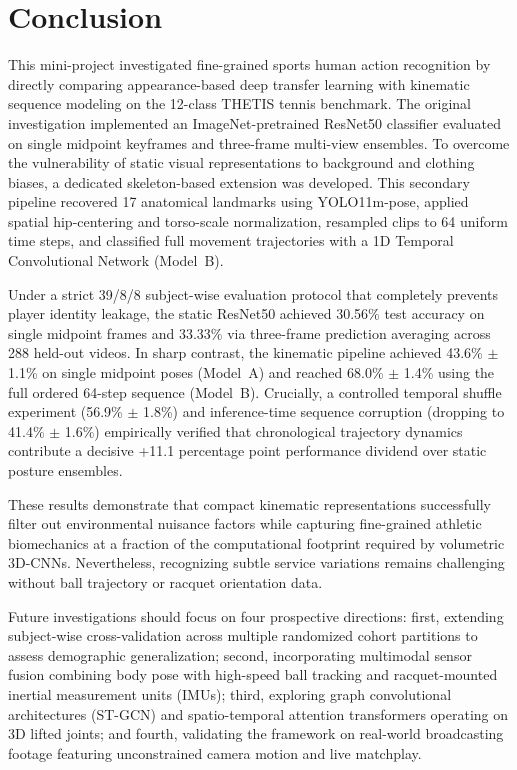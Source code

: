 \documentclass[12pt,a4paper]{article}
\begin{document}
\clearpage
\section{Conclusion}
This mini-project investigated fine-grained sports human action recognition by directly comparing appearance-based deep transfer learning with kinematic sequence modeling on the 12-class THETIS tennis benchmark. The original investigation implemented an ImageNet-pretrained ResNet50 classifier evaluated on single midpoint keyframes and three-frame multi-view ensembles. To overcome the vulnerability of static visual representations to background and clothing biases, a dedicated skeleton-based extension was developed. This secondary pipeline recovered 17 anatomical landmarks using YOLO11m-pose, applied spatial hip-centering and torso-scale normalization, resampled clips to 64 uniform time steps, and classified full movement trajectories with a 1D Temporal Convolutional Network (Model~B).

Under a strict 39/8/8 subject-wise evaluation protocol that completely prevents player identity leakage, the static ResNet50 achieved 30.56\% test accuracy on single midpoint frames and 33.33\% via three-frame prediction averaging across 288 held-out videos. In sharp contrast, the kinematic pipeline achieved 43.6\% $\pm$ 1.1\% on single midpoint poses (Model~A) and reached 68.0\% $\pm$ 1.4\% using the full ordered 64-step sequence (Model~B). Crucially, a controlled temporal shuffle experiment (56.9\% $\pm$ 1.8\%) and inference-time sequence corruption (dropping to 41.4\% $\pm$ 1.6\%) empirically verified that chronological trajectory dynamics contribute a decisive +11.1 percentage point performance dividend over static posture ensembles.

These results demonstrate that compact kinematic representations successfully filter out environmental nuisance factors while capturing fine-grained athletic biomechanics at a fraction of the computational footprint required by volumetric 3D-CNNs. Nevertheless, recognizing subtle service variations remains challenging without ball trajectory or racquet orientation data.

Future investigations should focus on four prospective directions: first, extending subject-wise cross-validation across multiple randomized cohort partitions to assess demographic generalization; second, incorporating multimodal sensor fusion combining body pose with high-speed ball tracking and racquet-mounted inertial measurement units (IMUs); third, exploring graph convolutional architectures (ST-GCN) and spatio-temporal attention transformers operating on 3D lifted joints; and fourth, validating the framework on real-world broadcasting footage featuring unconstrained camera motion and live matchplay.
\end{document}
